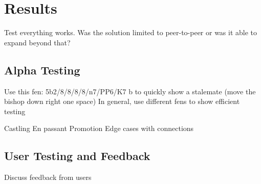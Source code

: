 \chapter{Results}
\label{chapter3}
Test everything works.\linebreak
Was the solution limited to peer-to-peer or was it able to expand beyond that?

\section{Alpha Testing}
Use this fen: 5b2/8/8/8/8/n7/PP6/K7 b to quickly show a stalemate (move the bishop down right one space)\linebreak
In general, use different fens to show efficient testing

Castling\linebreak
En passant\linebreak
Promotion\linebreak
Edge cases with connections

\section{User Testing and Feedback}
Discuss feedback from users